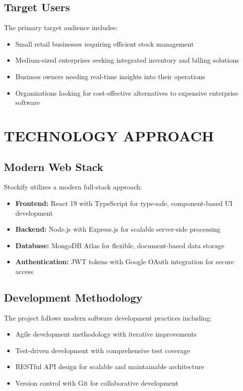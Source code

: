 \subsection{Target Users}
The primary target audience includes:
\begin{itemize}
\item Small retail businesses requiring efficient stock management
\item Medium-sized enterprises seeking integrated inventory and billing solutions
\item Business owners needing real-time insights into their operations
\item Organizations looking for cost-effective alternatives to expensive enterprise software
\end{itemize}

\section{TECHNOLOGY APPROACH}

\subsection{Modern Web Stack}
Stockify utilizes a modern full-stack approach:
\begin{itemize}
\item \textbf{Frontend:} React 19 with TypeScript for type-safe, component-based UI development
\item \textbf{Backend:} Node.js with Express.js for scalable server-side processing
\item \textbf{Database:} MongoDB Atlas for flexible, document-based data storage
\item \textbf{Authentication:} JWT tokens with Google OAuth integration for secure access
\end{itemize}

\subsection{Development Methodology}
The project follows modern software development practices including:
\begin{itemize}
\item Agile development methodology with iterative improvements
\item Test-driven development with comprehensive test coverage
\item RESTful API design for scalable and maintainable architecture
\item Version control with Git for collaborative development
\end{itemize}

